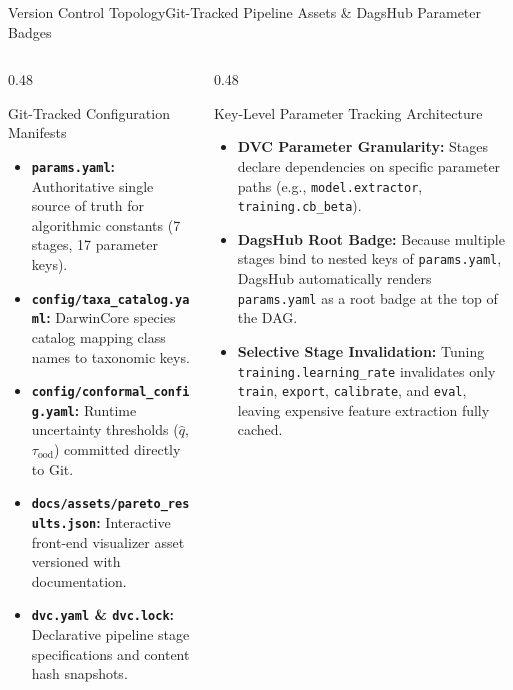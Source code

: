 \begin{frame}{Version Control Topology}{Git-Tracked Pipeline Assets \& DagsHub Parameter Badges}
    \begin{columns}[T]
        \begin{column}{0.48\textwidth}
            \begin{block}{Git-Tracked Configuration Manifests}
                \begin{itemize}\scriptsize
                    \item \textbf{\texttt{params.yaml}:} Authoritative single source of truth for algorithmic constants (7 stages, 17 parameter keys).
                    \item \textbf{\texttt{config/taxa\_catalog.yaml}:} DarwinCore species catalog mapping class names to taxonomic keys.
                    \item \textbf{\texttt{config/conformal\_config.yaml}:} Runtime uncertainty thresholds ($\hat{q}$, $\tau_{\text{ood}}$) committed directly to Git.
                    \item \textbf{\texttt{docs/assets/pareto\_results.json}:} Interactive front-end visualizer asset versioned with documentation.
                    \item \textbf{\texttt{dvc.yaml} \& \texttt{dvc.lock}:} Declarative pipeline stage specifications and content hash snapshots.
                \end{itemize}
            \end{block}
        \end{column}
        \begin{column}{0.48\textwidth}
            \begin{block}{Key-Level Parameter Tracking Architecture}
                \begin{itemize}\scriptsize
                    \item \textbf{DVC Parameter Granularity:}
                        Stages declare dependencies on specific parameter paths (e.g., \texttt{model.extractor}, \texttt{training.cb\_beta}).
                    \item \textbf{DagsHub Root Badge:}
                        Because multiple stages bind to nested keys of \texttt{params.yaml}, DagsHub automatically renders \texttt{params.yaml} as a root badge at the top of the DAG.
                    \item \textbf{Selective Stage Invalidation:}
                        Tuning \texttt{training.learning\_rate} invalidates only \texttt{train}, \texttt{export}, \texttt{calibrate}, and \texttt{eval}, leaving expensive feature extraction fully cached.
                \end{itemize}
            \end{block}
        \end{column}
    \end{columns}



\end{frame}
